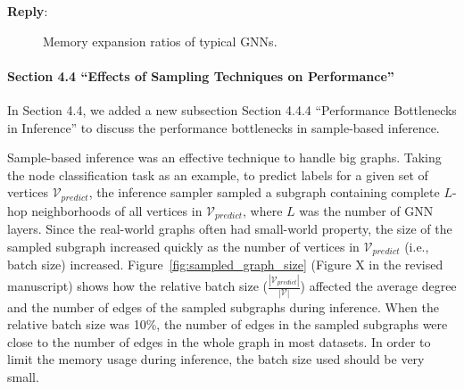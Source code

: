 \documentclass[12pt]{article}
\newenvironment{reply}
   {\medskip \noindent \textbf{Reply}:\  }
   {\medskip}
\begin{document}
\begin{reply}
     \begin{figure}[H]
        \caption{Memory expansion ratios of typical GNNs.}
        \label{fig:compare_memory_expasion_ratio}
     \end{figure}
     
     \paragraph{Section 4.4 ``Effects of Sampling Techniques on Performance''}
     In Section 4.4, we added a new subsection  Section 4.4.4 ``Performance Bottlenecks in Inference'' to discuss the performance bottlenecks in sample-based inference.
     
     Sample-based inference was an effective technique to handle big graphs.
     Taking the node classification task as an example, to predict labels for a given set of vertices $\mathcal{V}_{predict}$, the inference sampler sampled a subgraph containing complete $L$-hop neighborhoods of all vertices in $\mathcal{V}_{predict}$, where $L$ was the number of GNN layers.
     Since the real-world graphs often had small-world property, the size of the sampled subgraph increased quickly as the number of vertices in $\mathcal{V}_{predict}$ (i.e., batch size) increased.
     Figure~\ref{fig:sampled_graph_size} (Figure X in the revised manuscript) shows how the relative batch size ($\frac{|\mathcal{V}_{predict}|}{|\mathcal{V}|}$) affected the average degree and the number of edges of the sampled subgraphs during inference.
     When the relative batch size was 10\%, the number of edges in the sampled subgraphs were close to the number of edges in the whole graph in most datasets.
     In order to limit the memory usage during inference, the batch size used should be very small.
     

\end{reply}
\end{document}
